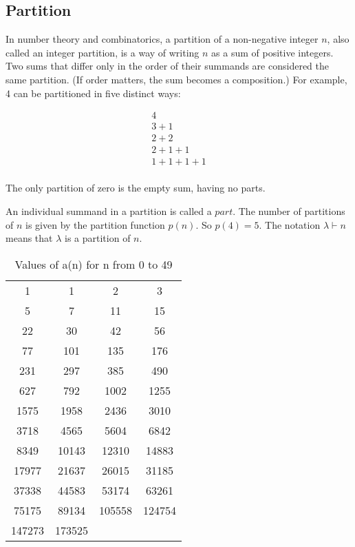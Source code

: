 \subsection{Partition}

In number theory and combinatorics, a partition of a non-negative integer $n$, also called an integer partition, is a way of writing $n$ as a sum of positive integers. Two sums that differ only in the order of their summands are considered the same partition. (If order matters, the sum becomes a composition.) For example, 4 can be partitioned in five distinct ways:

\[
    \begin{array}{c}
      4 \\
      3 + 1 \\
      2 + 2 \\
      2 + 1 + 1 \\
      1 + 1 + 1 + 1 \\
    \end{array}
\]

The only partition of zero is the empty sum, having no parts.


An individual summand in a partition is called a $part$. The number of partitions of $n$ is given by the partition function $p(n)$. So $p(4) = 5$. The notation $\lambda \vdash n$ means that $\lambda$ is a partition of $n$.

\begin{table}[H]
    \centering
    \begin{tabular}{@{}cccc@{}}
        \midrule
        1      & 1      & 2      & 3      \\
        5      & 7      & 11     & 15     \\
        22     & 30     & 42     & 56     \\
        77     & 101    & 135    & 176    \\
        231    & 297    & 385    & 490    \\
        627    & 792    & 1002   & 1255   \\
        1575   & 1958   & 2436   & 3010   \\
        3718   & 4565   & 5604   & 6842   \\
        8349   & 10143  & 12310  & 14883  \\
        17977  & 21637  & 26015  & 31185  \\
        37338  & 44583  & 53174  & 63261  \\
        75175  & 89134  & 105558 & 124754 \\
        147273 & 173525 &        &        \\
        \bottomrule
    \end{tabular}
    \caption{Values of a(n) for n from 0 to 49}
\end{table}

